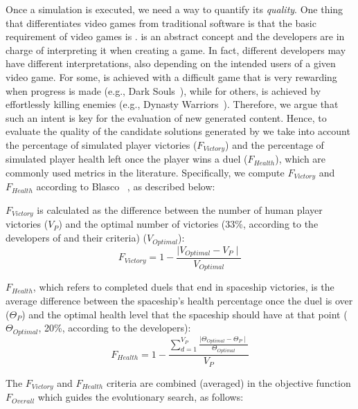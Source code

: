 Once a simulation is executed, we need a way to quantify its \textit{quality}. One thing that differentiates video games from traditional software is that the basic requirement of video games is .  is an abstract concept and the developers are in charge of interpreting it when creating a game. In fact, different developers may have different interpretations, also depending on the intended users of a given video game. For some,  is achieved with a difficult game that is very rewarding when progress is made (e.g., Dark Souls~\cite{darksouls}), while for others,  is achieved by effortlessly killing enemies (e.g., Dynasty Warriors~\cite{dynastywarriors}). Therefore, we argue that such an intent is key for the evaluation of new generated content.
Hence, to evaluate the quality of the candidate solutions generated by \ApproachName we take into account  the percentage of simulated player victories ($F_{Victory}$) and the percentage of simulated player health left once the player wins a duel ($F_{Health}$), which are commonly used metrics in the literature. Specifically, we compute  $F_{Victory}$ and $F_{Health}$ according to Blasco \etal~\cite{blasco2021evolutionary}, as described below:

$F_{Victory}$ is calculated as the difference between the number of human player victories ($V_{P}$) and the optimal number of victories (33\%, according to the developers of \CaseStudy{} and their criteria) ($V_{Optimal}$):
\begin{equation}
F_{Victory} = 1 -\frac{\mid V_{Optimal} - V_{P} \mid}{ V_{Optimal}}
\end{equation}

$F_{Health}$, which refers to completed duels that end in spaceship victories, is the average difference between the spaceship's health percentage once the duel is over ($\Theta_{P}$) and the optimal health level that the spaceship should have at that point ($\Theta_{Optimal}$, 20\%, according to the developers):
\begin{equation}
F_{Health} = 1 - \frac{\sum\limits_{d=1}^{V_{P}}\frac{\mid \Theta_{Optimal} - \Theta_{P} \mid}{ \Theta_{Optimal}}}{V_{P}}
\end{equation}

The $F_{Victory}$ and $F_{Health}$ criteria are combined (\ie averaged) in  the objective function $F_{Overall}$ which guides the evolutionary search, as follows:


